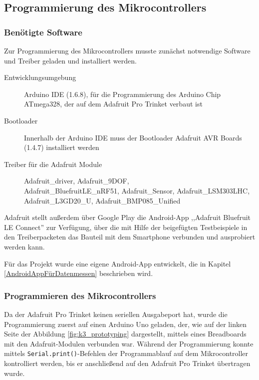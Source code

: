 \subsection{Programmierung des Mikrocontrollers}
\label{kapitel_programmierungMikrocontroller}

\subsubsection{Benötigte Software}

Zur Programmierung des Mikrocontrollers musste zunächst notwendige Software und Treiber geladen und installiert werden.

\begin{description}
	\item[Entwicklungsumgebung] Arduino IDE (1.6.8), für die Programmierung des Arduino Chip ATmega328, der auf dem Adafruit Pro Trinket verbaut ist
	\item[Bootloader] Innerhalb der Arduino IDE muss der Bootloader Adafruit AVR Boards (1.4.7) installiert werden
	\item[Treiber für die Adafruit Module] Adafruit\_driver, Adafruit\_9DOF, \\ Adafruit\_BluefruitLE\_nRF51, Adafruit\_Sensor, Adafruit\_LSM303LHC, \\ Adafruit\_L3GD20\_U, Adafruit\_BMP085\_Unified
\end{description}

Adafruit stellt außerdem über Google Play die Android-App ,,Adafruit Bluefruit LE Connect'' zur Verfügung, über die mit Hilfe der beigefügten Testbeispiele in den Treiberpacketen das Bauteil mit dem Smartphone verbunden und ausprobiert werden kann. 

Für das Projekt wurde eine eigene Android-App entwickelt, die in Kapitel \ref{AndroidAppFürDatenmessen} beschrieben wird.

\subsubsection{Programmieren des Mikrocontrollers}
Da der Adafruit Pro Trinket keinen seriellen Ausgabeport hat, wurde die Programmierung zuerst auf einen Arduino Uno geladen, der, wie auf der linken Seite der Abbildung \ref{fig:k3_prototyping} dargestellt, mittels eines Breadboards mit den Adafruit-Modulen verbunden war. Während der Programmierung konnte mittels \texttt{Serial.print()}-Befehlen der Programmablauf auf dem Mikrocontroller kontrolliert werden, bis er anschließend auf den Adafruit Pro Trinket übertragen wurde.

